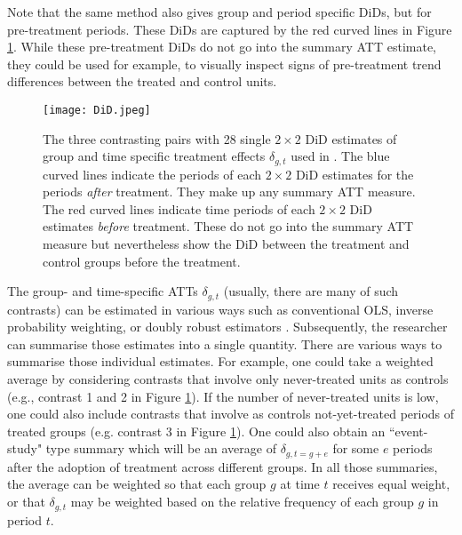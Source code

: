 Note that the same method also gives group and period specific DiDs, but for pre-treatment periods. These DiDs are captured by the red curved lines in Figure \ref{fig:Callaway}. While these pre-treatment DiDs do not go into the summary ATT estimate, they could be used for example, to visually inspect signs of pre-treatment trend differences between the treated and control units. 

\begin{figure}[t]
  \centering
  \texttt{[image: DiD.jpeg]}
  \caption{The three contrasting pairs with 28 single $2\times 2$ DiD estimates of group and time specific treatment effects $\delta_{g,t}$ used in \textcite{Callaway.2020}. The blue curved lines indicate the periods of each $2\times 2$ DiD estimates for the periods \textit{after} treatment. They make up any summary ATT measure. The red curved lines indicate time periods of each $2\times 2$ DiD estimates \textit{before} treatment. These do not go into the summary ATT measure but nevertheless show the DiD between the treatment and control groups before the treatment.}
  \label{fig:Callaway}
\end{figure}

The group- and time-specific ATTs $\delta_{g,t}$ (usually, there are many of such contrasts) can be estimated in various ways such as conventional OLS, inverse probability weighting, or doubly robust estimators \cite{Callaway.2020}. Subsequently, the researcher can summarise those estimates into a single quantity. There are various ways to summarise those individual estimates. For example, one could take a weighted average by considering contrasts that involve only never-treated units as controls (e.g., contrast 1 and 2 in Figure \ref{fig:Callaway}). If the number of never-treated units is low, one could also include contrasts that involve as controls not-yet-treated periods of treated groups (e.g. contrast 3 in Figure \ref{fig:Callaway}). One could also obtain an ``event-study" type summary which will be an average of $\delta_{g,t=g+e}$ for some $e$ periods after the adoption of treatment across different groups. In all those summaries, the average can be weighted so that each group $g$ at time $t$ receives equal weight, or that $\delta_{g,t}$ may be weighted based on the relative frequency of each group $g$ in period $t$. 


